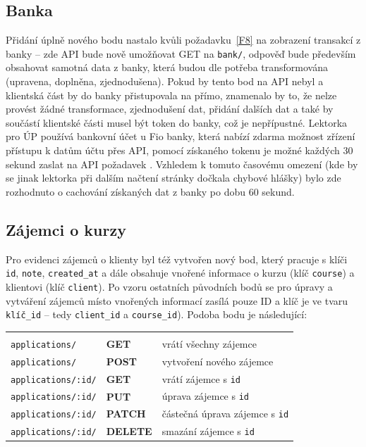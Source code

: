 \subsection{Banka}

Přidání úplně nového bodu nastalo kvůli požadavku~\ref{F8} na zobrazení transakcí z banky -- zde API bude nově umožňovat GET na \verb|bank/|, odpověď bude především obsahovat samotná data z banky, která budou dle potřeba transformována (upravena, doplněna, zjednodušena). Pokud by tento bod na API nebyl a klientská část by do banky přistupovala na přímo, znamenalo by to, že nelze provést žádné transformace, zjednodušení dat, přidání dalších dat a také by součástí klientské části musel být token do banky, což je nepřípustné. Lektorka pro ÚP používá bankovní účet u Fio banky, která nabízí zdarma možnost zřízení přístupu k datům účtu přes API, pomocí získaného tokenu je možné každých 30 sekund zaslat na API požadavek \cite{fioapi}. Vzhledem k tomuto časovému omezení (kde by se jinak lektorka při dalším načtení stránky dočkala chybové hlášky) bylo zde rozhodnuto o cachování získaných dat z banky po dobu 60 sekund.

\subsection{Zájemci o kurzy}

Pro evidenci zájemců o klienty byl též vytvořen nový bod, který pracuje s klíči \verb|id|, \verb|note|, \verb|created_at| a dále obsahuje vnořené informace o kurzu (klíč \verb|course|) a klientovi (klíč \verb|client|). Po vzoru ostatních původních bodů se pro úpravy a vytváření zájemců místo vnořených informací zasílá pouze ID a klíč je ve tvaru \verb|klíč_id| -- tedy \verb|client_id| a \verb|course_id|). Podoba bodu je následující:

{\centering
\begin{tabular}{p{\apiA\textwidth}p{\apiB\textwidth}p{\apiC\textwidth}}&&\\
    \verb|applications/|             & \textbf{GET}      & vrátí všechny zájemce\\
    \verb|applications/|             & \textbf{POST}     & vytvoření nového zájemce\\
    \verb|applications/:id/|         & \textbf{GET}      & vrátí zájemce s \verb|id|\\
    \verb|applications/:id/|         & \textbf{PUT}      & úprava zájemce s \verb|id|\\
    \verb|applications/:id/|         & \textbf{PATCH}    & částečná úprava zájemce s \verb|id|\\
    \verb|applications/:id/|         & \textbf{DELETE}   & smazání zájemce s \verb|id|\\
\end{tabular}}


